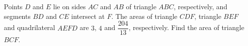 Points $D$ and $E$ lie on sides $AC$ and $AB$ of triangle $ABC$, respectively, and segments $BD$ and $CE$ intersect at $F$. The areas of triangle $CDF$, triangle $BEF$ and quadrilateral $AEFD$ are $3$, $4$ and $\dfrac{204}{13}$, respectively. Find the area of triangle $BCF$.
